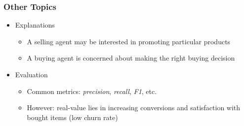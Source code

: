 \documentclass{beamer}
\begin{document}
\begin{frame}
    \frametitle{Other Topics}
    \begin{itemize}
    \item Explanations
        \begin{itemize}
        \item A selling agent may be interested in promoting particular
            products
        \item A buying agent is concerned about making the right buying
            decision
        \end{itemize}
    \item Evaluation
        \begin{itemize}
        \item Common metrics: \emph{precision}, \emph{recall}, \emph{F1}, etc.
        \item However: real-value lies in increasing conversions and
            satisfaction with bought items (low churn rate)
        \end{itemize}
    \end{itemize}
\end{frame}


\end{document}
